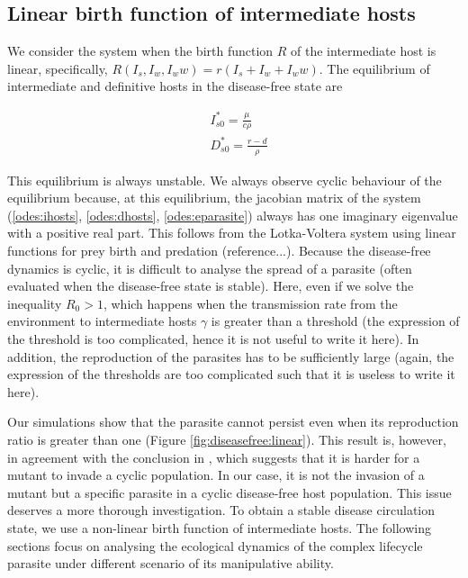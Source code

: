 \documentclass[11pt]{article}
\begin{document}
\subsection*{Linear birth function of intermediate hosts}
We consider the system when the birth function $R$ of the intermediate host is linear, specifically, $R(I_s, I_w, I_ww) = r(I_s + I_w + I_ww)$. The equilibrium of intermediate and definitive hosts in the disease-free state are

\begin{align*}
& I_{s0}^* = \frac{\mu}{c \rho} \\
& D_{s0}^* = \frac{r - d}{\rho}
\end{align*}

This equilibrium is always unstable. 
We always observe cyclic behaviour of the equilibrium because, at this equilibrium, the jacobian matrix of the system (\ref{odes:ihosts}, \ref{odes:dhosts}, \ref{odes:eparasite}) always has one imaginary eigenvalue with a positive real part. 
This follows from the Lotka-Voltera system using linear functions for prey birth and predation (reference...). 
Because the disease-free dynamics is cyclic, it is difficult to analyse the spread of a parasite (often evaluated when the disease-free state is stable). 
Here, even if we solve the inequality $R_0 > 1$, which happens when the transmission rate from the environment to intermediate hosts $\gamma$ is greater than a threshold (the expression of the threshold is too complicated, hence it is not useful to write it here). 
In addition, the reproduction of the parasites has to be sufficiently large (again, the expression of the thresholds are too complicated such that it is useless to write it here).

Our simulations show that the parasite cannot persist even when its reproduction ratio is greater than one (Figure \ref{fig:diseasefree:linear}). This result is, however, in agreement with the conclusion in \citet{Ripa:Evol:2013}, which suggests that it is harder for a mutant to invade a cyclic population. 
In our case, it is not the invasion of a mutant but a specific parasite in a cyclic disease-free host population. 
This issue deserves a more thorough investigation. 
To obtain a stable disease circulation state, we use a non-linear birth function of intermediate hosts. The following sections focus on analysing the ecological dynamics of the complex lifecycle parasite under different scenario of its manipulative ability.
\end{document}
